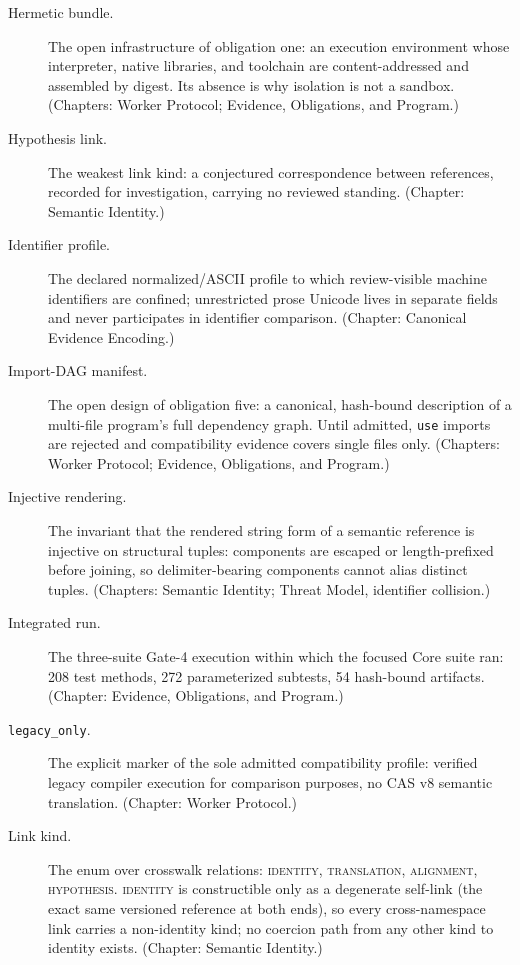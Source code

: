 \begin{description}
\item[Hermetic bundle.] The open infrastructure of obligation one: an execution environment whose interpreter, native libraries, and toolchain are content-addressed and assembled by digest. Its absence is why isolation is not a sandbox. (Chapters: Worker Protocol; Evidence, Obligations, and Program.)

\item[Hypothesis link.] The weakest link kind: a conjectured correspondence between references, recorded for investigation, carrying no reviewed standing. (Chapter: Semantic Identity.)

\item[Identifier profile.] The declared normalized/ASCII profile to which review-visible machine identifiers are confined; unrestricted prose Unicode lives in separate fields and never participates in identifier comparison. (Chapter: Canonical Evidence Encoding.)

\item[Import-DAG manifest.] The open design of obligation five: a canonical, hash-bound description of a multi-file program's full dependency graph. Until admitted, \texttt{use} imports are rejected and compatibility evidence covers single files only. (Chapters: Worker Protocol; Evidence, Obligations, and Program.)

\item[Injective rendering.] The invariant that the rendered string form of a semantic reference is injective on structural tuples: components are escaped or length-prefixed before joining, so delimiter-bearing components cannot alias distinct tuples. (Chapters: Semantic Identity; Threat Model, identifier collision.)

\item[Integrated run.] The three-suite Gate-4 execution within which the focused Core suite ran: 208 test methods, 272 parameterized subtests, 54 hash-bound artifacts. (Chapter: Evidence, Obligations, and Program.)

\item[\texttt{legacy\_only}.] The explicit marker of the sole admitted compatibility profile: verified legacy compiler execution for comparison purposes, no CAS v8 semantic translation. (Chapter: Worker Protocol.)

\item[Link kind.] The enum over crosswalk relations: \textsc{identity}, \textsc{translation}, \textsc{alignment}, \textsc{hypothesis}. \textsc{identity} is constructible only as a degenerate self-link (the exact same versioned reference at both ends), so every cross-namespace link carries a non-identity kind; no coercion path from any other kind to identity exists. (Chapter: Semantic Identity.)


\end{description}
